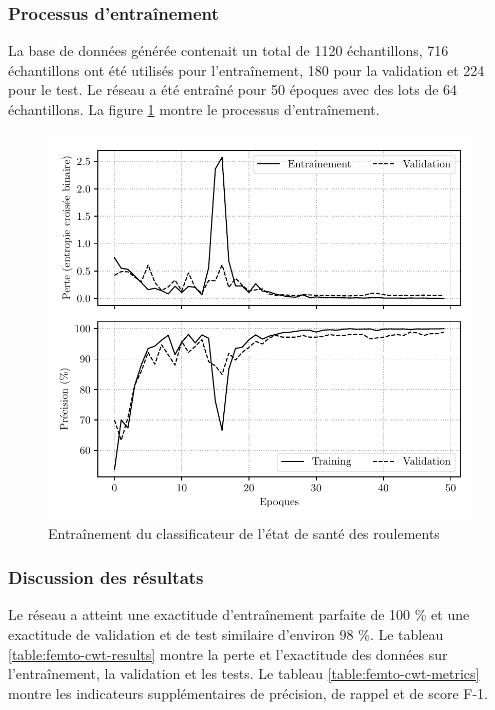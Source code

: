 \subsubsection{Processus d'entraînement}%
\label{subsub:training_process}
La base de données générée contenait un total de 1120 échantillons, 716 échantillons ont été utilisés pour l'entraînement, 180 pour la validation et 224 pour le test. Le réseau a été entraîné pour 50 époques avec des lots de 64 échantillons. La figure \ref{fig:scaleogram-classifier-training} montre le processus d'entraînement.

\begin{figure}[H]
	\centering
	\includegraphics{figures/femtocwt_training_fr.pdf}
	\caption{Entraînement du classificateur de l'état de santé des roulements}%
	\label{fig:scaleogram-classifier-training}
\end{figure}

\subsubsection{Discussion des résultats}%
\label{subsub:results-discussion}
Le réseau a atteint une exactitude d'entraînement parfaite de 100 \% et une exactitude de validation et de test similaire d'environ 98 \%. Le tableau \ref{table:femto-cwt-results} montre la perte et l'exactitude des données sur l'entraînement, la validation et les tests. Le tableau \ref{table:femto-cwt-metrics} montre les indicateurs supplémentaires de précision, de rappel et de score F-1.

